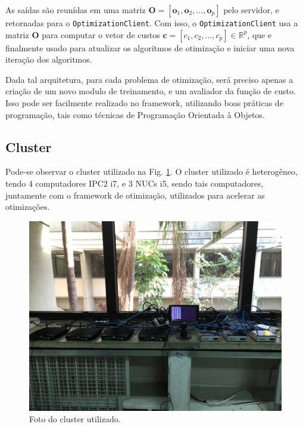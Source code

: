 \documentclass[
10pt, %
a4paper, %
oneside, %
headinclude,footinclude, %
BCOR5mm, %
]{scrartcl}
\newcommand*{\inlinecode}{\texttt}%
\begin{document}
As saídas são reunídas em uma matriz 
\( \mathrm{\mathbf{O}} = \left[ \mathrm{\mathbf{o}}_1, \mathrm{\mathbf{o}}_2, \dots, \mathrm{\mathbf{o}}_p \right] \) pelo servidor, e retornadas para o  \inlinecode{OptimizationClient}. Com isso, o  \inlinecode{OptimizationClient} usa a matriz \( \mathrm{\mathbf{O}} \) para computar o vetor de custos \( \mathrm{\mathbf{c}} = \left[ c_1, c_2, \dots, c_p \right] \in \mathbb{R}^p \), que e finalmente usado para atualizar os algoritmos de otimização e iniciar uma nova iteração dos algoritmos.

Dada tal arquitetura, para cada problema de otimização, será preciso apenas a criação de um novo modulo de treinamento, e um avaliador da função de custo. Isso pode ser facilmente realizado no framework, utilizando boas práticas de programação, tais como técnicas de Programação Orientada à Objetos.	

\subsection{Cluster}

Pode-se observar o cluster utilizado na Fig. \ref{fig:cluster}. O cluster utilizado é heterogêneo, tendo 4 computadores IPC2 i7, e 3 NUCs i5, sendo tais computadores, juntamente com o framework de otimização, utilizados para acelerar as otimizações.

\begin{figure}[htb]
\begin{center}
\includegraphics[width=1\textwidth]{image1.jpg}
\end{center}
\caption{\label{fig:cluster}Foto do cluster utilizado.}
\end{figure}
\end{document}

